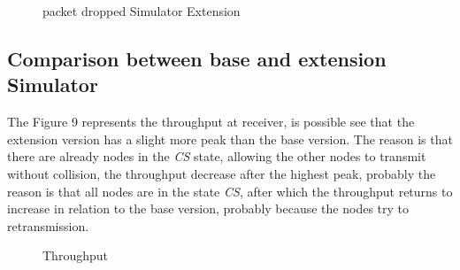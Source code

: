 \documentclass[conference]{IEEEtran}
\begin{document}
\begin{figure}[H]
	\centering	 
	\caption{packet dropped Simulator Extension}%
\end{figure}

\subsection{Comparison between base and extension Simulator}
The Figure 9 represents the throughput at receiver, is possible see that the extension version has a slight more peak than the base version. The reason is that there are already nodes in the \textit{CS} state, allowing the other nodes to transmit  without collision, the throughput decrease after the highest peak, probably the reason  is that all nodes are in the state \textit{CS}, after which the throughput returns to increase in relation to the base version, probably because the nodes try to retransmission.

 \begin{figure}[H]
	\centering	 
	\caption{Throughput}%
\end{figure}
\end{document}
